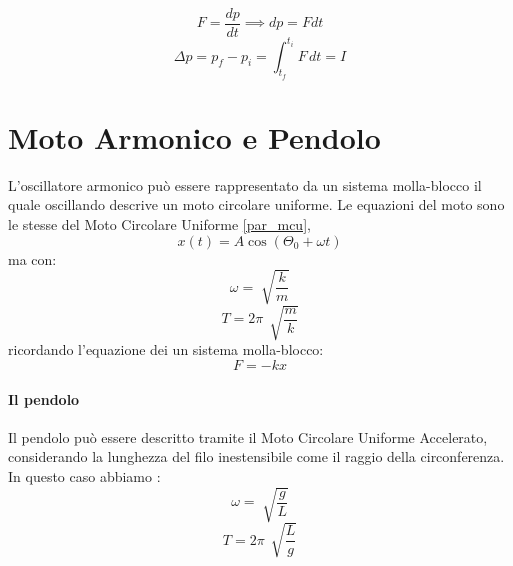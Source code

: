         \begin{equation*}
            F = \frac{dp}{dt} \implies dp = F dt
        \end{equation*}
        \begin{equation*}
            \Delta p = p_f - p_i = \int_{t_f}^{t_i} F \,dt = I 
        \end{equation*}
    
    \section{Moto Armonico e Pendolo} L'oscillatore armonico può essere 
    rappresentato da un sistema molla-blocco il quale oscillando descrive un 
    moto circolare uniforme. Le equazioni del moto sono le stesse del Moto 
    Circolare Uniforme \ref{par_mcu},
        \begin{equation}
            x(t) = A \cos(\Theta_0 + \omega t)
        \end{equation}
        ma con:
        \begin{equation*}
            \omega = \sqrt[]{\frac{k}{m}}
        \end{equation*}
        \begin{equation*}
            T = 2\pi \, \sqrt[]{\frac{m}{k}}
        \end{equation*}
        ricordando l'equazione dei un sistema molla-blocco:
        \begin{equation*}
            F = -kx
        \end{equation*}
        
        \paragraph{Il pendolo} Il pendolo può essere descritto tramite il
        Moto Circolare Uniforme Accelerato, considerando la lunghezza del filo 
        inestensibile come il raggio della circonferenza. In questo caso abbiamo
        :
        \begin{equation*}
            \omega = \sqrt[]{\frac{g}{L}}
        \end{equation*}
        \begin{equation*}
            T = 2\pi \, \sqrt[]{\frac{L}{g}}
        \end{equation*}


